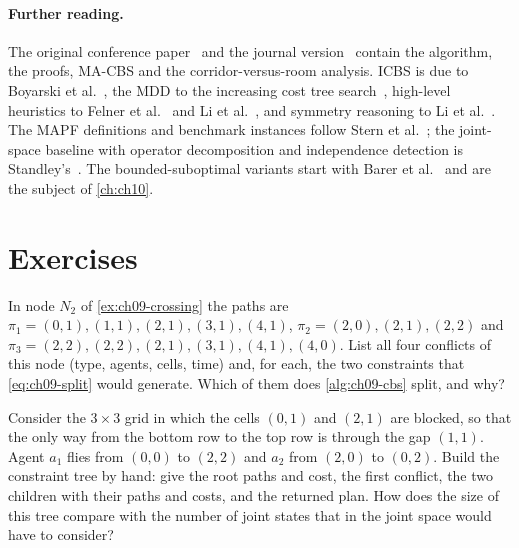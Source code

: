 \paragraph{Further reading.}
The original conference paper~\cite{sharon2012cbs} and the journal
version~\cite{sharon2015cbs} contain the algorithm, the proofs, MA-CBS and
the corridor-versus-room analysis. ICBS is due to Boyarski et
al.~\cite{boyarski2015icbs}, the MDD to the increasing cost tree
search~\cite{sharon2013icts}, high-level heuristics to Felner et
al.~\cite{felner2018adding} and Li et al.~\cite{li2019improved}, and
symmetry reasoning to Li et al.~\cite{li2019symmetry,li2020pairwise}. The
MAPF definitions and benchmark instances follow Stern et
al.~\cite{stern2019mapf}; the joint-space baseline with operator
decomposition and independence detection is Standley's~\cite{standley2010finding}.
The bounded-suboptimal variants start with Barer et al.~\cite{barer2014ecbs}
and are the subject of \cref{ch:ch10}.

\section{Exercises}
\label{sec:ch09-exercises}

\begin{exercise}[\difficulty{1}]
\label{exr:ch09-constraints}
In node $N_2$ of \cref{ex:ch09-crossing} the paths are $\pi_1 =
(0,1),(1,1),(2,1),(3,1),(4,1)$, $\pi_2 = (2,0),(2,1),(2,2)$ and $\pi_3 =
(2,2),(2,2),(2,1),(3,1),(4,1),(4,0)$. List all four conflicts of this node
(type, agents, cells, time) and, for each, the two constraints that
\cref{eq:ch09-split} would generate. Which of them does \cref{alg:ch09-cbs}
split, and why?
\end{exercise}

\begin{exercise}[\difficulty{2}]
\label{exr:ch09-handtree}
Consider the $3 \times 3$ grid in which the cells $(0,1)$ and $(2,1)$ are
blocked, so that the only way from the bottom row to the top row is through
the gap $(1,1)$. Agent $a_1$ flies from $(0,0)$ to $(2,2)$ and $a_2$ from
$(2,0)$ to $(0,2)$. Build the constraint tree by hand: give the root paths
and cost, the first conflict, the two children with their paths and costs,
and the returned plan. How does the size of this tree compare with the
number of joint states that \astar in the joint space would have to
consider?
\end{exercise}

